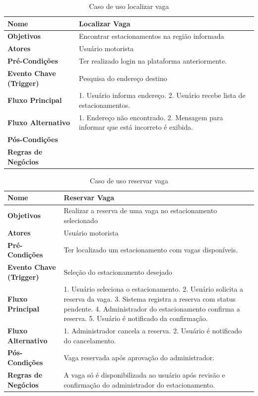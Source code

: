\begin{table}[H]
\begin{center}
\caption{Caso de uso localizar vaga}
\label{tab:caso-uso-localizar-vaga}
\begin{tabular}{|p{4cm}|p{9cm}|}
\hline
\textbf{Nome} & Localizar Vaga \\
\hline
\textbf{Objetivos} & Encontrar estacionamentos na região informada \\
\hline
\textbf{Atores} & Usuário motorista \\
\hline
\textbf{Pré-Condições} & Ter realizado login na plataforma anteriormente. \\
\hline
\textbf{Evento Chave (Trigger)} & Pesquisa do endereço destino \\
\hline
\textbf{Fluxo Principal} & 1. Usuário informa endereço. 2. Usuário recebe lista de estacionamentos. \\
\hline
\textbf{Fluxo Alternativo} & 1. Endereço não encontrado. 2. Mensagem para informar que está incorreto é exibida. \\
\hline
\textbf{Pós-Condições} & \\
\hline
\textbf{Regras de Negócios} & \\
\hline
\end{tabular}
\end{center}
\end{table}

\begin{table}[H]
\begin{center}
\caption{Caso de uso reservar vaga}
\label{tab:caso-uso-reservar-vaga}
\begin{tabular}{|p{4cm}|p{9cm}|}
\hline
\textbf{Nome} & Reservar Vaga \\
\hline
\textbf{Objetivos} & Realizar a reserva de uma vaga no estacionamento selecionado \\
\hline
\textbf{Atores} & Usuário motorista \\
\hline
\textbf{Pré-Condições} & Ter localizado um estacionamento com vagas disponíveis. \\
\hline
\textbf{Evento Chave (Trigger)} & Seleção do estacionamento desejado \\
\hline
\textbf{Fluxo Principal} & 1. Usuário seleciona o estacionamento. 2. Usuário solicita a reserva da vaga. 3. Sistema registra a reserva com status pendente. 4. Administrador do estacionamento confirma a reserva. 5. Usuário é notificado da confirmação. \\
\hline
\textbf{Fluxo Alternativo} & 1. Administrador cancela a reserva. 2. Usuário é notificado do cancelamento. \\
\hline
\textbf{Pós-Condições} & Vaga reservada após aprovação do administrador. \\
\hline
\textbf{Regras de Negócios} & A vaga só é disponibilizada ao usuário após revisão e confirmação do administrador do estacionamento. \\
\hline
\end{tabular}
\end{center}
\end{table}


